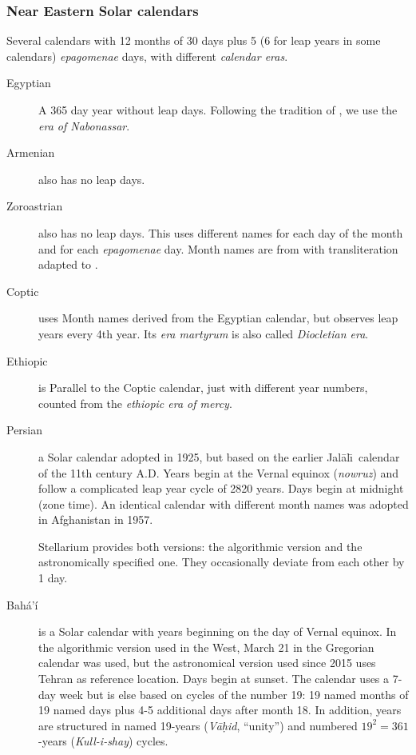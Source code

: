 \subsubsection{Near Eastern Solar calendars}
Several calendars with 12 months of 30 days plus 5 (6 for leap years
in some calendars) \emph{epagomenae} days, with different \emph{calendar eras}.
\begin{description}
\item[Egyptian] A 365 day year without leap days. Following the
  tradition of , we use the \emph{era of Nabonassar}.
\item[Armenian] also has no leap days.
\item[Zoroastrian] also has no leap days. This uses different names
  for each day of the month and for each \emph{epagomenae} day. Month
  names are from \citet[\S69]{Ginzel:ChronologieI} with
  transliteration adapted to \citet{Reingold-Dershowitz:2018}.
\item[Coptic] uses Month names derived from the Egyptian calendar, but observes
  leap years every 4th year. Its \emph{era martyrum} is also called
  \emph{Diocletian era}.
\item[Ethiopic] is Parallel to the Coptic calendar, just with different
  year numbers, counted from the \emph{ethiopic era of mercy}.
\item[Persian] a Solar calendar adopted in 1925,
  but based on the earlier Jal\=al\=\i\ calendar of the 11th century
  A.D. Years begin at the Vernal equinox (\emph{nowruz}) and follow a
  complicated leap year cycle of 2820 years. Days begin at midnight
  (zone time). An identical calendar with different month names was
  adopted in Afghanistan in 1957.

  Stellarium provides both versions: the algorithmic version and the
  astronomically specified one. They occasionally deviate from each
  other by 1 day.
\item[Bahá’í] is a Solar calendar with years beginning on the day of
  Vernal equinox.  In the algorithmic version used in
  the West, March 21 in the Gregorian calendar was used, but the
  astronomical version used since 2015 uses Tehran as reference
  location.  Days begin at sunset. The calendar uses a 7-day week but
  is else based on cycles of the number 19: 19 named months of 19
  named days plus 4-5 additional days after month 18. In addition,
  years are structured in named 19-years (\emph{Vā\d{h}id}, ``unity'') and
  numbered $19^2=361$-years (\emph{Kull-i-shay}) cycles.
\end{description}

